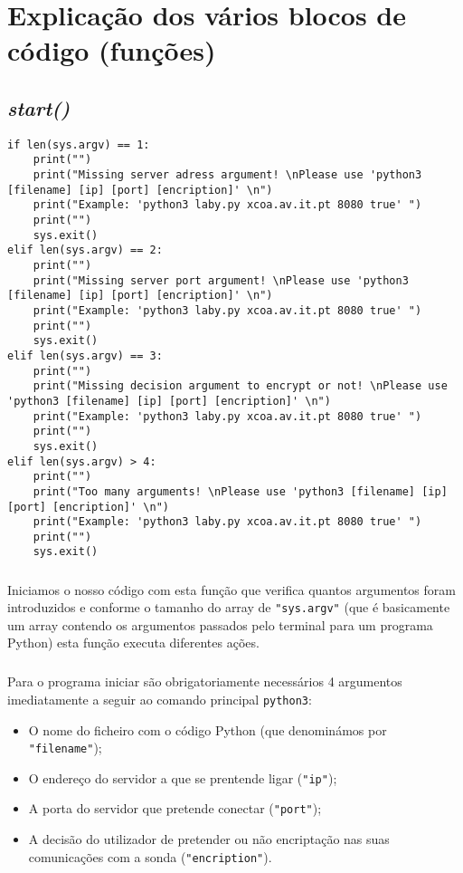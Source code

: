 \documentclass[a4paper]{report}
\begin{document}
\chapter{Explicação dos vários blocos de código (funções)}
\label{chap.explicacao}

\section{\textit{start()}}
\begin{lstlisting}
if len(sys.argv) == 1:
	print("")
	print("Missing server adress argument! \nPlease use 'python3 [filename] [ip] [port] [encription]' \n")
	print("Example: 'python3 laby.py xcoa.av.it.pt 8080 true' ")
	print("")
	sys.exit()
elif len(sys.argv) == 2:
	print("")
	print("Missing server port argument! \nPlease use 'python3 [filename] [ip] [port] [encription]' \n")
	print("Example: 'python3 laby.py xcoa.av.it.pt 8080 true' ")
	print("")
	sys.exit()
elif len(sys.argv) == 3:
	print("")
	print("Missing decision argument to encrypt or not! \nPlease use 'python3 [filename] [ip] [port] [encription]' \n")
	print("Example: 'python3 laby.py xcoa.av.it.pt 8080 true' ")
	print("")
	sys.exit()
elif len(sys.argv) > 4:
	print("")
	print("Too many arguments! \nPlease use 'python3 [filename] [ip] [port] [encription]' \n")
	print("Example: 'python3 laby.py xcoa.av.it.pt 8080 true' ")
	print("")
	sys.exit()
\end{lstlisting}
\paragraph{}Iniciamos o nosso código com esta função que verifica quantos argumentos foram introduzidos e conforme o tamanho do array de \texttt{"sys.argv"} (que é basicamente um array contendo os argumentos passados pelo terminal para um programa Python) esta função executa diferentes ações.\cite{args}

\paragraph{}Para o programa iniciar são obrigatoriamente necessários 4 argumentos imediatamente a seguir ao comando principal \texttt{python3}:

\begin{itemize}
\item O nome do ficheiro com o código Python (que denominámos por \texttt{"filename"});
\item O endereço do servidor a que se prentende ligar (\texttt{"ip"});
\item A porta do servidor que pretende conectar (\texttt{"port"});
\item A decisão do utilizador de pretender ou não encriptação nas suas comunicações com a sonda (\texttt{"encription"}).
\end{itemize}
\end{document}
